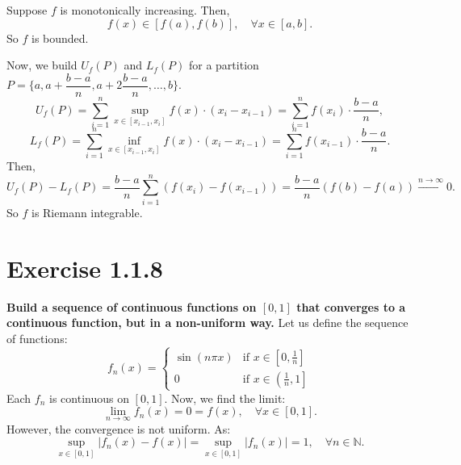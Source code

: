 \documentclass[11pt]{article}
\newcommand{\card}[1]{\lvert #1 \rvert}
\begin{document}
Suppose \(f\) is monotonically increasing. Then,
\[f(x) \in [f(a), f(b)], \quad \forall x \in [a,b].\]
So \(f\) is bounded.

Now, we build $U_f(P)$ and $L_f(P)$ for a partition $P = \{a, a + \dfrac{b-a}{n}, a + 2\dfrac{b-a}{n}, \ldots, b\}$.
\[U_f(P) = \sum_{i=1}^{n} \sup_{x \in [x_{i-1}, x_i]} f(x) \cdot (x_i - x_{i-1}) = \sum_{i=1}^{n} f(x_i) \cdot \dfrac{b-a}{n},\]
\[L_f(P) = \sum_{i=1}^{n} \inf_{x \in [x_{i-1}, x_i]} f(x) \cdot (x_i - x_{i-1}) = \sum_{i=1}^{n} f(x_{i-1}) \cdot \dfrac{b-a}{n}.\]
Then,
\[U_f(P) - L_f(P) = \dfrac{b-a}{n} \sum_{i=1}^{n} \left(f(x_i) - f(x_{i-1})\right) = \dfrac{b-a}{n} \left(f(b) - f(a)\right) \stackrel{n \to \infty}{\longrightarrow} 0.\]
So \(f\) is Riemann integrable. 

\section*{Exercise 1.1.8}
\textbf{\large Build a sequence of continuous functions on \([0,1]\) that converges to a continuous function, but in a non-uniform way.}
Let us define the sequence of functions:
\[f_n(x) = \begin{cases}
    \sin(n \pi x) & \text{if } x \in \left[0, \frac{1}{n}\right] \\
    0 & \text{if } x \in \left(\frac{1}{n}, 1\right]
\end{cases}
\]
Each \(f_n\) is continuous on \([0,1]\). Now, we find the limit:
\[\lim_{n \to \infty} f_n(x) = 0 = f(x), \quad \forall x \in [0,1].\]
However, the convergence is not uniform. As:
\[\sup_{x \in [0,1]} \card{f_n(x) - f(x)} = \sup_{x \in [0,1]} \card{f_n(x)} = 1, \quad \forall n \in \mathbb{N}.\]

\begin{center}
\end{center}
\end{document}
